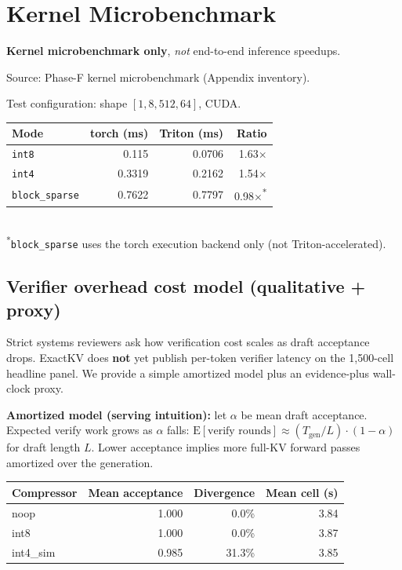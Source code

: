 \documentclass[11pt]{article}
\begin{document}
\section{Kernel Microbenchmark}
\textbf{Kernel microbenchmark only}, \emph{not} end-to-end inference speedups.

\noindent Source: Phase-F kernel microbenchmark (Appendix inventory).

\noindent Test configuration: shape $[1,8,512,64]$, CUDA.

\begin{center}
\small
{}
\label{tab:kernel-microbench}
\begin{tabular}{@{}lrrr@{}}
\toprule
\textbf{Mode} & \textbf{torch (ms)} & \textbf{Triton (ms)} & \textbf{Ratio} \\ \midrule
\texttt{int8} & 0.115 & 0.0706 & 1.63$\times$ \\
\texttt{int4} & 0.3319 & 0.2162 & 1.54$\times$ \\
\texttt{block\_sparse} & 0.7622 & 0.7797 & 0.98$\times$\textsuperscript{*} \\
\bottomrule
\end{tabular}\\[0.25em]
{\footnotesize \textsuperscript{*}\texttt{block\_sparse} uses the torch execution backend only (not Triton-accelerated).}
\end{center}

\subsection{Verifier overhead cost model (qualitative + proxy)}

Strict systems reviewers ask how verification cost scales as draft acceptance drops.
ExactKV does \textbf{not} yet publish per-token verifier latency on the 1,500-cell
headline panel. We provide a simple amortized model plus an evidence-plus wall-clock proxy.

\noindent\textbf{Amortized model (serving intuition):} let $\alpha$ be mean draft
acceptance. Expected verify work grows as $\alpha$ falls:
$\mathrm{E}[\text{verify rounds}] \approx (T_{\text{gen}}/L)\cdot(1-\alpha)$ for draft
length $L$. Lower acceptance implies more full-KV forward passes amortized over the
generation.

\begin{center}
\small
{}
\label{tab:verifier-proxy}
\begin{tabular}{lrrr}
\toprule
\textbf{Compressor} & \textbf{Mean acceptance} & \textbf{Divergence} & \textbf{Mean cell (s)} \\
\midrule
noop      & 1.000 &  0.0\% & 3.84 \\
int8      & 1.000 &  0.0\% & 3.87 \\
int4\_sim & 0.985 & 31.3\% & 3.85 \\
\bottomrule
\end{tabular}
\end{center}
\end{document}
